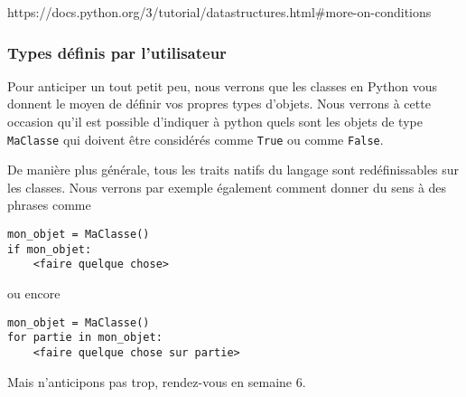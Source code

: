     https://docs.python.org/3/tutorial/datastructures.html\#more-on-conditions

    \hypertarget{types-duxe9finis-par-lutilisateur}{%
\subsubsection{Types définis par
l'utilisateur}\label{types-duxe9finis-par-lutilisateur}}

    Pour anticiper un tout petit peu, nous verrons que les classes en Python
vous donnent le moyen de définir vos propres types d'objets. Nous
verrons à cette occasion qu'il est possible d'indiquer à python quels
sont les objets de type \texttt{MaClasse} qui doivent être considérés
comme \texttt{True} ou comme \texttt{False}.

De manière plus générale, tous les traits natifs du langage sont
redéfinissables sur les classes. Nous verrons par exemple également
comment donner du sens à des phrases comme

\begin{verbatim}
mon_objet = MaClasse()
if mon_objet:
    <faire quelque chose>
\end{verbatim}

ou encore

\begin{verbatim}
mon_objet = MaClasse()
for partie in mon_objet:
    <faire quelque chose sur partie>
\end{verbatim}

Mais n'anticipons pas trop, rendez-vous en semaine 6.


    
    
    
